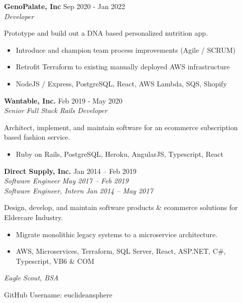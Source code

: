 \documentclass[line,margin]{res}
\begin{document}
\begin{resume}
\textbf{GenoPalate, Inc} \hfill Sep 2020 - Jan 2022 \\
{\sl Developer}

Prototype and build out a DNA based personalized nutrition app.

\begin{itemize}
\item Introduce and champion team process improvements (Agile / SCRUM)
\item Retrofit Terraform to existing manually deployed AWS infrastructure
\item NodeJS / Express, PostgreSQL, React, AWS Lambda, SQS, Shopify
\end{itemize}

\textbf{Wantable, Inc.} \hfill Feb 2019 - May 2020 \\
{\sl Senior Full Stack Rails Developer}

Architect, implement, and maintain software for an ecommerce subscription based fashion service.

\begin{itemize}
\item Ruby on Rails, PostgreSQL, Heroku, AngularJS, Typescript, React
\end{itemize}

\textbf{Direct Supply, Inc.} \hfill Jan 2014 -- Feb 2019 \\
{\sl Software Engineer} \hfill {\sl May 2017 -- Feb 2019} \\
{\sl Software Engineer, Intern} \hfill {\sl Jan 2014 -- May 2017}

Design, develop, and maintain software products \& ecommerce solutions for Eldercare Industry.

\begin{itemize}
\item Migrate monolithic legacy systems to a microservice architecture. 
\item AWS, Microservices, Terraform, SQL Server, React, ASP.NET, C\#, Typescript, VB6 \& COM
\end{itemize}




{\sl Eagle Scout, BSA}

GitHub Username: euclideansphere

\end{resume}
\end{document}
